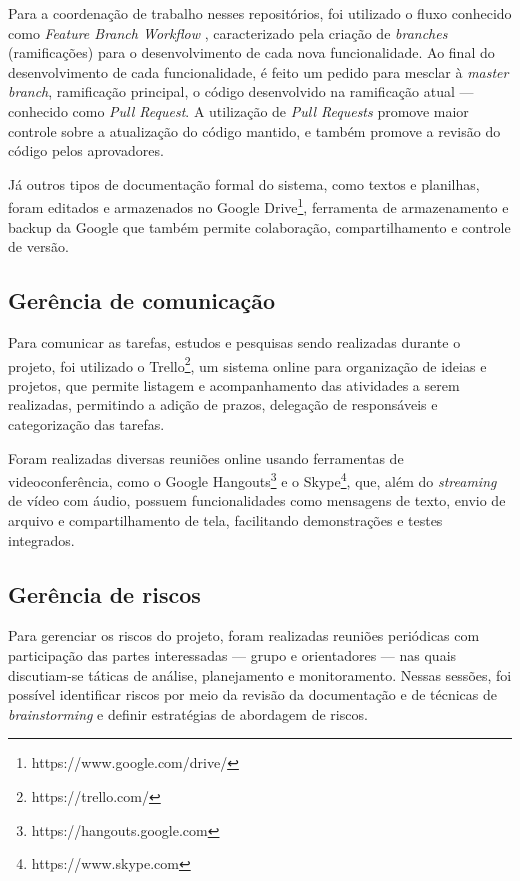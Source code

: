 Para a coordenação de trabalho nesses repositórios, foi utilizado o fluxo conhecido como \textit{Feature Branch Workflow} \cite{atlassian}, caracterizado pela criação de \textit{branches} (ramificações) para o desenvolvimento de cada nova funcionalidade. Ao final do desenvolvimento de cada funcionalidade, é feito um pedido para mesclar à \textit{master branch}, ramificação principal, o código desenvolvido na ramificação atual --- conhecido como \emph{Pull Request}. A utilização de \emph{Pull Requests} promove maior controle sobre a atualização do código mantido, e também promove a revisão do código pelos aprovadores. 

Já outros tipos de documentação formal do sistema, como textos e planilhas, foram editados e armazenados no Google Drive\footnote{https://www.google.com/drive/}, ferramenta de armazenamento e backup da Google que também permite colaboração, compartilhamento e controle de versão.

\subsection{Gerência de comunicação}

Para comunicar as tarefas, estudos e pesquisas sendo realizadas durante o projeto, foi utilizado o Trello\footnote{https://trello.com/}, um sistema online para organização de ideias e projetos, que permite listagem e acompanhamento das atividades a serem realizadas, permitindo a adição de prazos, delegação de responsáveis e categorização das tarefas.

Foram realizadas diversas reuniões online usando ferramentas de videoconferência, como o Google Hangouts\footnote{https://hangouts.google.com} e o Skype\footnote{https://www.skype.com}, que, além do \emph{streaming} de vídeo com áudio, possuem funcionalidades como mensagens de texto, envio de arquivo e compartilhamento de tela, facilitando demonstrações e testes integrados.

\subsection{Gerência de riscos}

Para gerenciar os riscos do projeto, foram realizadas reuniões periódicas com participação das partes interessadas --- grupo e orientadores --- nas quais discutiam-se táticas de análise, planejamento e monitoramento. Nessas sessões, foi possível identificar riscos por meio da revisão da documentação e de técnicas de \emph{brainstorming} e definir estratégias de abordagem de riscos.

